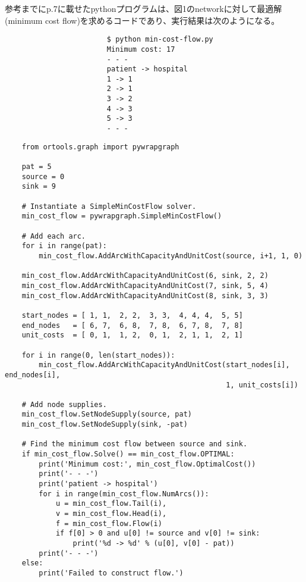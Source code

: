 \documentclass[10pt,uplatex]{jsarticle}
\theoremstyle{case}
\begin{document}
    \newpage
    参考までにp.7に載せたpythonプログラムは、図1のnetworkに対して最適解(minimum cost flow)を求めるコードであり、実行結果は次のようになる。\\
    \begin{figure*}[h]
        \begin{verbatim}
                        $ python min-cost-flow.py
                        Minimum cost: 17
                        - - -
                        patient -> hospital
                        1 -> 1
                        2 -> 1
                        3 -> 2
                        4 -> 3
                        5 -> 3
                        - - -
        \end{verbatim}
        \captionsetup{labelformat=empty}
    \end{figure*}

    \newpage
        \begin{verbatim}
    from ortools.graph import pywrapgraph

    pat = 5
    source = 0
    sink = 9

    # Instantiate a SimpleMinCostFlow solver.
    min_cost_flow = pywrapgraph.SimpleMinCostFlow()

    # Add each arc.
    for i in range(pat):
        min_cost_flow.AddArcWithCapacityAndUnitCost(source, i+1, 1, 0)

    min_cost_flow.AddArcWithCapacityAndUnitCost(6, sink, 2, 2)
    min_cost_flow.AddArcWithCapacityAndUnitCost(7, sink, 5, 4)
    min_cost_flow.AddArcWithCapacityAndUnitCost(8, sink, 3, 3)

    start_nodes = [ 1, 1,  2, 2,  3, 3,  4, 4, 4,  5, 5]
    end_nodes   = [ 6, 7,  6, 8,  7, 8,  6, 7, 8,  7, 8]
    unit_costs  = [ 0, 1,  1, 2,  0, 1,  2, 1, 1,  2, 1]

    for i in range(0, len(start_nodes)):
        min_cost_flow.AddArcWithCapacityAndUnitCost(start_nodes[i], end_nodes[i],
                                                    1, unit_costs[i])

    # Add node supplies.
    min_cost_flow.SetNodeSupply(source, pat)
    min_cost_flow.SetNodeSupply(sink, -pat)

    # Find the minimum cost flow between source and sink.
    if min_cost_flow.Solve() == min_cost_flow.OPTIMAL:
        print('Minimum cost:', min_cost_flow.OptimalCost())
        print('- - -')
        print('patient -> hospital')
        for i in range(min_cost_flow.NumArcs()):
            u = min_cost_flow.Tail(i),
            v = min_cost_flow.Head(i),
            f = min_cost_flow.Flow(i)
            if f[0] > 0 and u[0] != source and v[0] != sink:
                print('%d -> %d' % (u[0], v[0] - pat))
        print('- - -')
    else:
        print('Failed to construct flow.')
        \end{verbatim}
\end{document}
